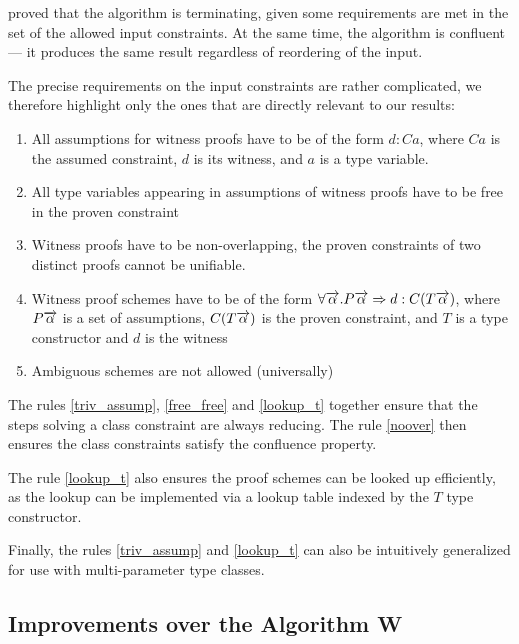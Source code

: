 \citet{vytiniotis2011outsidein} proved that the algorithm is terminating, given some requirements are met in the set of the allowed input constraints. At the same time, the algorithm is confluent --- it produces the same result regardless of reordering of the input.

The precise requirements on the input constraints are rather complicated, we therefore highlight only the ones that are directly relevant to our results:

\begin{enumerate}
    \item All assumptions for witness proofs have to be of the form $d : C a$, where $C a$ is the assumed constraint, $d$ is its witness, and $a$ is a type variable. \label{triv_assump}
    \item All type variables appearing in assumptions of witness proofs have to be free in the proven constraint \label{free_free}
    \item Witness proofs have to be non-overlapping, the proven constraints of two distinct proofs cannot be unifiable. \label{noover}
    \item Witness proof schemes have to be of the form $\forall \overrightarrow{\alpha} . P \overrightarrow{\alpha} \Rightarrow d : C (T \overrightarrow{\alpha})$, where $P \overrightarrow{\alpha}$ is a set of assumptions, $C (T \overrightarrow{\alpha})$ is the proven constraint, and $T$ is a type constructor and $d$ is the witness \label{lookup_t}
    \item Ambiguous schemes are not allowed (universally) \label{ambi_rule}
\end{enumerate}

The rules \ref{triv_assump}, \ref{free_free} and \ref{lookup_t} together ensure that the steps solving a class constraint are always reducing. The rule \ref{noover} then ensures the class constraints satisfy the confluence property.

The rule \ref{lookup_t} also ensures the proof schemes can be looked up efficiently, as the lookup can be implemented via a lookup table indexed by the $T$ type constructor.

Finally, the rules \ref{triv_assump} and \ref{lookup_t} can also be intuitively generalized for use with multi-parameter type classes.

\subsection{Improvements over the Algorithm W}


